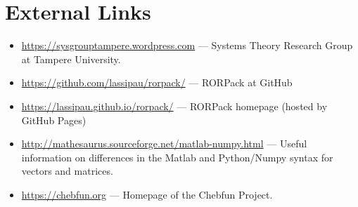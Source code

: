 \documentclass[11pt, a4paper]{amsart}
\theoremstyle{definition}
\numberwithin{equation}{section}
\newcommand{\shorten}[1]{{\color{gray}#1}}
\renewcommand{\shorten}[1]{}
\begin{document}
  \appendix

\section{External Links}

\begin{itemize}
  \item \href{https://sysgrouptampere.wordpress.com}{https://sysgrouptampere.wordpress.com} --- Systems Theory Research Group at Tampere University.
  \item  \href{https://github.com/lassipau/rorpack/}{https://github.com/lassipau/rorpack/} --- RORPack at GitHub
\item \href{https://lassipau.github.io/rorpack/}{https://lassipau.github.io/rorpack/}  --- RORPack homepage (hosted by GitHub Pages)
  \item \href{http://mathesaurus.sourceforge.net/matlab-numpy.html}{http://mathesaurus.sourceforge.net/matlab-numpy.html} --- Useful information on differences in the Matlab and Python/Numpy syntax for vectors and matrices.
  \item \href{https://chebfun.org}{https://chebfun.org} --- Homepage of the Chebfun Project.
\end{itemize}

\shorten{

  \section{Code: TODO}

  \begin{itemize}
    \item
  \end{itemize}

  TODO [\blue{Later}]
  \begin{itemize}
    \item Integrate the use of \texttt{FEniCS/Dolfin}
    \item Extend construction to systems with complex parameters (need to include values $P(-i\gw_k)$ etc, find a general way to handle both real and complex systems at the same time?
    \item improved color choices for the plots, define ``styles'', e.g., ``temperature'', ``general'', ``deflection''
    \item Youtube Video lecture on usage of RORPack!
  \end{itemize}
}
\end{document}
